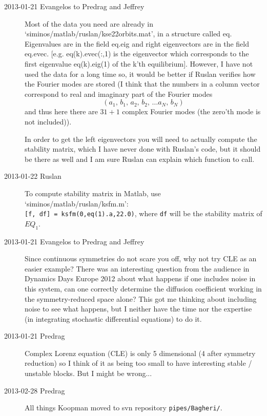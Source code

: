 \begin{description}
\item[2013-01-21 Evangelos to Predrag and Jeffrey] Most of the data you need are
already in `siminos/matlab/ruslan/kse22orbits.mat', in a structure called eq.
Eigenvalues are in the field eq.eig and right eigenvectors are in the field eq.evec.
[e.g. eq(k).evec(:,1) is the eigenvector which corresponds to the first eigenvalue eq(k).eig(1)
of the k'th equilibrium]. However, I have not used the data for a long time so, it would
be better if Ruslan verifies how the Fourier modes are stored (I think that the numbers
in a column vector correspond to real and imaginary part of the Fourier modes
\[
 (a_1,\, b_1,\, a_2,\, b_2,\, \ldots a_N,\, b_N)
\]
and thus here there are $31+1$ complex Fourier modes (the zero'th mode is not included)).

In order to get the left eigenvectors you will need to actually compute the
stability matrix, which I have never done with Ruslan's code, but it should be
there as well and I am sure Ruslan can explain which function to call.
\item[2013-01-22 Ruslan] To compute stability matrix in Matlab, use `siminos/matlab/ruslan/ksfm.m':\\ {\tt [f, df] = ksfm(0,eq(1).a,22.0)}, where {\tt df} will be the stability matrix of $EQ_1$.

\item[2013-01-21 Evangelos to Predrag and Jeffrey] Since continuous symmetries do not scare you
off, why not try CLE as an easier example? There was an interesting question from the
audience in Dynamics Days Europe 2012 about what happens if one includes
noise in this system,
can one correctly determine the diffusion coefficient working in the symmetry-reduced space alone?
This got me thinking about including noise to see what happens, but I neither have the time
nor the expertise (in integrating stochastic differential equations) to do it.

\item[2013-01-21  Predrag] Complex Lorenz equation (CLE)
is only 5 dimensional (4 after symmetry reduction) so I think of it
as being too small to have interesting stable / unstable blocks. But
I might be wrong...


\item[2013-02-28  Predrag] All things Koopman moved to svn repository
\texttt{pipes/Bagheri/}.


\end{description}
